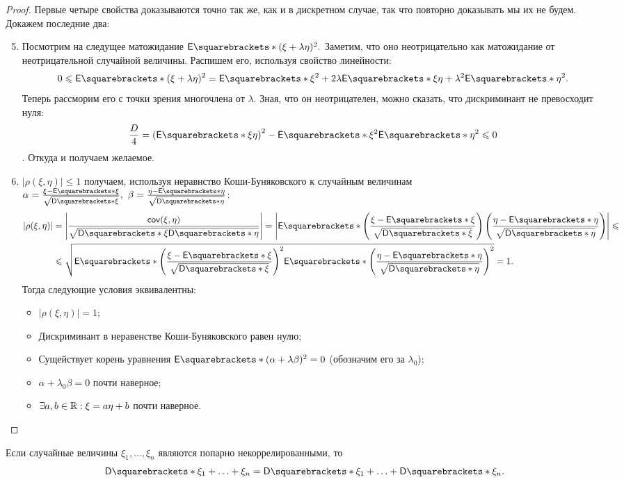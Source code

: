 \begin{proof}
	Первые четыре свойства доказываются точно так же, как и в дискретном случае, так что повторно доказывать мы их не будем. Докажем последние два:
	\begin{enumerate}
		\setcounter{enumi}{4}
		\item Посмотрим на следущее матожидание \(\E{(\xi + \lambda\eta)^2}. \) Заметим, что оно неотрицательно как матожидание от неотрицательной случайной величины. Распишем его, используя свойство линейности: \[0 \leq \E{(\xi + \lambda\eta)^2} = \E{\xi^2} + 2\lambda\E{\xi\eta} + \lambda^2\E{\eta^2}.\] Теперь рассморим его с точки зрения многочлена от \(\lambda\). Зная, что он неотрицателен, можно сказать, что дискриминант не превосходит нуля: \[ \frac{D}{4} = \left(\E{\xi\eta} \right)^2 - \E{\xi^2}\E{\eta^2} \leq 0 \]. Откуда и получаем желаемое.
		
		\item \(\left|\rho(\xi, \eta)\right| \leq 1\) получаем, используя неравнство Коши-Буняковского к случайным величинам \(\alpha = \frac{\xi - \E{\xi}}{\sqrt{\D{\xi}}},\ \beta = \frac{\eta - \E{\eta}}{\sqrt{\D{\eta}}}\):
		\begin{align}
			\left|\rho(\xi, \eta)\right| &= \left|\frac{\cov(\xi, \eta)}{\sqrt{\D{\xi}\D{\eta}}}\right| = \left|\E{\left(\frac{\xi - \E{\xi}}{\sqrt{\D{\xi}}}\right)\left(\frac{\eta - \E{\eta}}{\sqrt{\D{\eta}}}\right)}\right| \leq \\
			&\leq \sqrt{\E{\left(\frac{\xi - \E{\xi}}{\sqrt{\D{\xi}}}\right)^2}\E{\left(\frac{\eta - \E{\eta}}{\sqrt{\D{\eta}}}\right)^2}} = 1.
		\end{align}
		Тогда следующие условия эквивалентны:
		\begin{itemize}
			\item \(\left|\rho(\xi, \eta) \right| = 1\);
			\item Дискриминант в неравенстве Коши-Буняковского равен нулю;
			\item Сущействует корень уравнения \(\E{(\alpha + \lambda\beta)^2} = 0\) (обозначим его за \(\lambda_0\));
			\item \(\alpha + \lambda_0\beta = 0\) почти наверное;
			\item \(\exists a,b \in \mathbb{R} : \xi = a\eta + b\) почти наверное. 
		\end{itemize}
	\end{enumerate}
\end{proof}
\begin{consequence}
	Если случайные величины \(\xi_1, \ldots, \xi_n \) являются попарно некоррелированными, то \[\D{\xi_1 + \ldots + \xi_n} = \D{\xi_1} + \ldots + \D{\xi_n}. \]
\end{consequence}
